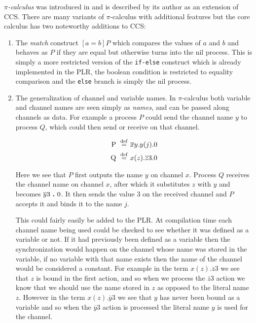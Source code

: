 	\textit{$\pi$-calculus} was introduced in \cite{Milner89acalculus} and is 
	described by its author as an extension of CCS. There are many variants of 
	$\pi$-calculus with additional features but the core calculus has two 
	noteworthy additions to CCS:
	
	\begin{enumerate}
		\item The \textit{match} construct $[a = b] P$ which compares the values 
		of $a$ and $b$ and behaves as $P$ if they are equal but otherwise turns 
		into the nil process. This is simply a more restricted version of the 
		\texttt{if-else} construct which is already implemented in the PLR, the 
		boolean condition is restricted to equality comparison and the 
		\texttt{else} branch is simply the nil process. 
		
		\item The generalization of channel and variable names. In $\pi$-calculus 
		both variable and channel names are seen simply as \textit{names}, and can 
		be passed along channels as data. For example a process $P$ could send the 
		channel name $y$ to process $Q$, which could then send or receive on that 
		channel.
		
	  \begin{align*}
			\mathrm{P} \ \stackrel{\mathrm{def}}{=}\  & \overline{x}y . y(j) . 0\\
			\mathrm{Q} \ \stackrel{\mathrm{def}}{=}\  & x(z) . \overline{z}3 . 0\\
		\end{align*} 
		
		Here we see that $P$ first outputs the name $y$ on channel $x$. Process 
		$Q$ receives the channel name on channel $x$, after which it substitutes
		$z$ with $y$ and becomes $\overline{y}3 \ \textbf{.}\  0$. It then sends the value
		3 on the received channel and $P$ accepts it and binds it to the name $j$.
		
		This could fairly easily be added to the PLR. At compilation time each 
		channel name being used could be checked to see whether it was defined as 
		a variable or not. If it had previously been defined as a variable then 
		the synchronization would happen on the channel whose name was stored in 
		the variable, if no variable with that name exists then the name of the 
		channel would be considered a constant. For example in the term $x(z) . 
		\overline{z}3$ we see that $z$ is bound in the first action, and so when 
		we process the $\overline{z}3$ action we know that we should use the name
		stored in $z$ as opposed to the literal name $z$. However in the term 
		$x(z) . \overline{y}3$ we see that $y$ has never been bound as a variable 
		and so when the $\overline{y}3$ action is processed the literal name $y$ 
		is used for the channel.
		
	\end{enumerate}
	
